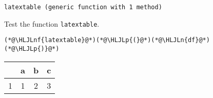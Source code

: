 \documentclass[12pt,a4paper]{article}
\newcommand{\HLJLn}[1]{#1}
\newcommand{\HLJLnf}[1]{\textcolor[RGB]{66,102,213}{#1}}
\newcommand{\HLJLp}[1]{#1}
\begin{document}
\begin{lstlisting}
latextable (generic function with 1 method)
\end{lstlisting}


Test the function \texttt{latextable}.


\begin{lstlisting}
(*@\HLJLnf{latextable}@*)(*@\HLJLp{(}@*)(*@\HLJLn{df}@*)(*@\HLJLp{)}@*)
\end{lstlisting}

\begin{tabular}{r|ccc}
	& a & b & c\\
	\hline
	1 & 1 & 2 & 3 \\
\end{tabular}
\end{document}
